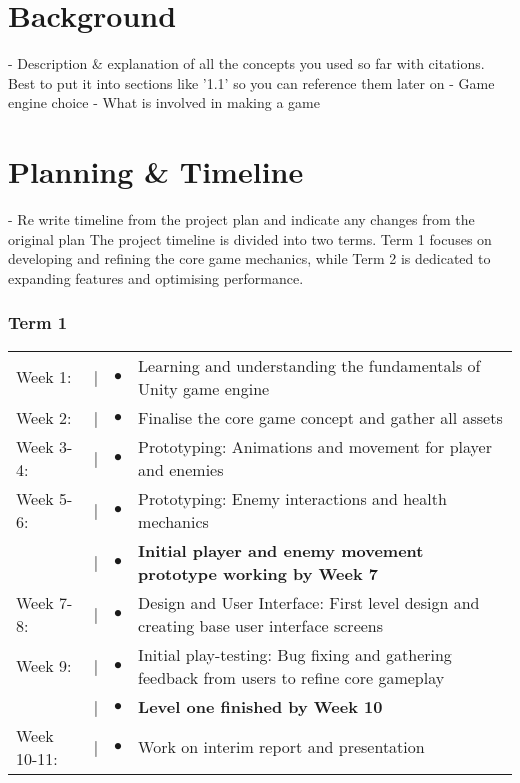 \documentclass[]{final_report}
\begin{document}
\chapter{Background}
- Description \& explanation of all the concepts you used so far with citations. Best to put it into sections like '1.1' so you can reference them later on \newline
- Game engine choice  \newline
- What is involved in making a game  \newline
 
\chapter{Planning \& Timeline}
- Re write timeline from the project plan and indicate any changes from the original plan\newline
The project timeline is divided into two terms. Term 1 focuses on developing and refining the core game mechanics, while Term 2 is dedicated to expanding features and optimising performance.

\subsection{Term 1}
\begin{tabular}{@{}p{2cm}@{}>{\raggedright\arraybackslash}p{0.5cm}@{}>{\raggedright\arraybackslash}p{0.5cm}@{}p{12cm}}
Week 1: & \textcolor{black}{|} & $\bullet$ & Learning and understanding the fundamentals of Unity game engine \\
Week 2: & \textcolor{black}{|} & $\bullet$ & Finalise the core game concept and gather all assets \\
Week 3-4: & \textcolor{black}{|} & $\bullet$ & Prototyping: Animations and movement for player and enemies\\
Week 5-6: & \textcolor{black}{|} & $\bullet$ &  Prototyping: Enemy interactions and health mechanics \\
& \textcolor{black}{|} & $\bullet$ & \textbf{Initial player and enemy movement prototype working by Week 7} \\
Week 7-8: & \textcolor{black}{|} & $\bullet$ & Design and User Interface: First level design and creating base user interface screens\\
Week 9: & \textcolor{black}{|} & $\bullet$ & Initial play-testing: Bug fixing and gathering feedback from users to refine core gameplay\\
& \textcolor{black}{|} & $\bullet$ & \textbf{Level one finished by Week 10} \\
Week 10-11: & \textcolor{black}{|} & $\bullet$ & Work on interim report and presentation \\
\end{tabular}
\end{document}
